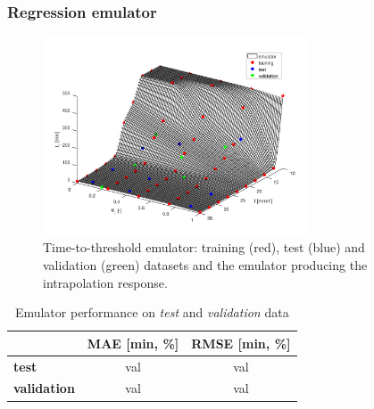 \subsubsection{Regression emulator}

\begin{figure}[htpb]
  \centering
  \includegraphics[width=0.7\textwidth]{Figures/emulator.png}
  \caption{Time-to-threshold emulator: training (red), test (blue) and validation (green) datasets and the emulator producing the intrapolation response.}
  \label{fig:regression_emulator}
\end{figure}


\begin{table}[htpb]
  \centering
  \caption{Emulator performance on \emph{test} and \emph{validation} data}
  \label{table label}
  \begin{tabular}{lcc}
    \toprule
     & \textbf{MAE [\si{\minute}, \si{\percent}]} & \textbf{RMSE [\si{\minute}, \si{\percent}]} \\
    \midrule
    \textbf{test} & val & val \\
    \textbf{validation} & val & val \\
    \bottomrule
  \end{tabular}
\end{table}

